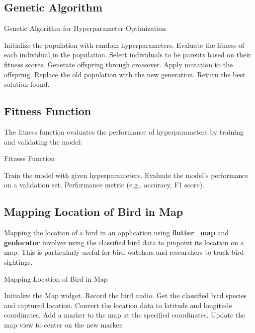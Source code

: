 \subsection{Genetic Algorithm}
\begin{algorithm}[H]
    \caption{Genetic Algorithm for Hyperparameter Optimization}
    \begin{algorithmic}[1]
        \STATE Initialize the population with random hyperparameters.
        \STATE Evaluate the fitness of each individual in the population.
        \STATE Select individuals to be parents based on their fitness scores.
        \STATE Generate offspring through crossover.
        \STATE Apply mutation to the offspring.
        \STATE Replace the old population with the new generation.
        \ENDFOR
        \STATE Return the best solution found.
    \end{algorithmic}
\end{algorithm}

\subsection{Fitness Function}
The fitness function evaluates the performance of hyperparameters by training
and validating the model:

\begin{algorithm}[H]
    \caption{Fitness Function}
    \begin{algorithmic}[1]
        \STATE Train the model with given hyperparameters.
        \STATE Evaluate the model's performance on a validation set.
        \RETURN Performance metric (e.g., accuracy, F1 score).
    \end{algorithmic}
\end{algorithm}

\subsection{Mapping Location of Bird in Map}

Mapping the location of a bird in an application using \textbf{flutter\_map} and
\textbf{geolocator} involves using the classified bird data to pinpoint its
location on a map. This is particularly useful for bird watchers and
researchers to track bird sightings.

\begin{algorithm}
    \caption{Mapping Location of Bird in Map}
    \begin{algorithmic}[1]
        \STATE Initialize the Map widget.
        \STATE Record the bird audio.
        \STATE Get the classified bird species and captured location.
        \STATE Convert the location data to latitude and longitude coordinates.
        \STATE Add a marker to the map at the specified coordinates.
        \STATE Update the map view to center on the new marker.
    \end{algorithmic}
\end{algorithm}
\newpage

